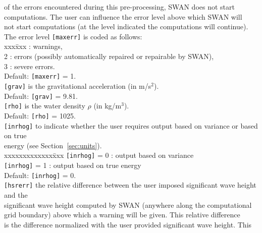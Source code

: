\documentclass[12pt]{book}
\begin{document}
\begin{tabbing}
                   of the errors encountered during this pre-processing, SWAN does not start\\
                   computations. The user can influence the error level above which SWAN will\\
                   not start computations (at the level indicated the computations will continue).\\
                   The error level {\tt [maxerr]} is coded as follows:\\
                   \pushtabs
                   xxx\=xxx  \>: warnings,\\
                   2 \>: errors (possibly automatically repaired or repairable by SWAN),\\
                   3 \>: severe errors.\\
                   \poptabs
                   Default: {\tt [maxerr]} = 1.\-\\
{\tt [grav]}    \> is the gravitational acceleration (in m/s$^2$).\+\\
                   Default: {\tt [grav]} = 9.81.\-\\
{\tt [rho]}     \> is the water density $\rho$ (in kg/m$^3$).\+\\
                   Default: {\tt [rho]} = 1025.\-\\
{\tt [inrhog]}  \> to indicate whether the user requires output based on variance or based on true\+\\
                   energy (see Section~\ref{sec:units}).\\
                   \pushtabs
                   xxxxxxxxxxxxx\=xxx \kill
                   {\tt [inrhog]} = 0 \>: output based on variance\\
                   {\tt [inrhog]} = 1 \>: output based on true energy\\
                   \poptabs
                   Default: {\tt [inrhog]} = 0.\-\\
{\tt [hsrerr]}  \> the relative difference between the user imposed significant wave height and the\+\\
                   significant wave height computed by SWAN (anywhere along the computational\\
                   grid boundary) above which a warning will be given. This relative difference\\
                   is the difference normalized with the user provided significant wave height. This\\

\end{tabbing}
\end{document}
